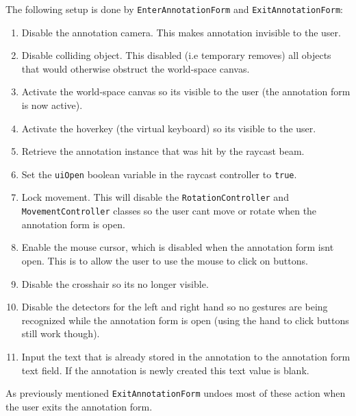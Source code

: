 The following setup is done by \texttt{EnterAnnotationForm} and \texttt{ExitAnnotationForm}:
\begin{enumerate}
    \item Disable the annotation camera. This makes annotation invisible to the user.
    \item Disable colliding object. This disabled (i.e temporary removes) all objects that would otherwise obstruct the world-space canvas.
    \item Activate the world-space canvas so its visible to the user (the annotation form is now active).
    \item Activate the hoverkey (the virtual keyboard) so its visible to the user.
    \item Retrieve the annotation instance that was hit by the raycast beam.  
    \item Set the \texttt{uiOpen} boolean variable in the raycast controller to \texttt{true}.
    \item Lock movement. This will disable the \texttt{RotationController} and \texttt{MovementController} classes so the user cant move or rotate when
            the annotation form is open.
    \item Enable the mouse cursor, which is disabled when the annotation form isnt open. This is to allow the user to use the mouse to click on buttons.
    \item Disable the crosshair so its no longer visible.
    \item Disable the detectors for the left and right hand so no gestures are being recognized while the annotation form is open (using the hand to click
            buttons still work though).
    \item Input the text that is already stored in the annotation to the annotation form text field. If the annotation is newly created this text value is blank.
\end{enumerate}

As previously mentioned \texttt{ExitAnnotationForm} undoes most of these action when the user exits the annotation form. 

